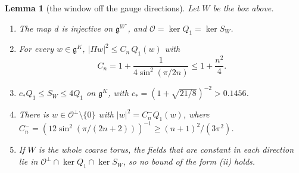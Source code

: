 \documentclass[11pt]{amsart}
\newtheorem{lemma}[theorem]{Lemma}
\theoremstyle{definition}
\theoremstyle{remark}
\numberwithin{equation}{section}
\newcommand{\g}{\mathfrak{g}}
\begin{document}
\begin{lemma}[the window off the gauge directions]\label{lem:windowgap}
Let $W$ be the box above.
\begin{enumerate}[label=\textup{(\roman*)},leftmargin=*]
\item The map $d$ is injective on $\g^{W^\circ}$, and $\mathcal O=\ker
Q_1=\ker S_W$.
\item For every $w\in\g^K$, $|\Pi w|^2\le C_n\,Q_1(w)$ with
\[
C_n=1+\frac1{4\sin^2(\pi/2n)}\le1+\frac{n^2}4 .
\]
\item $c_*Q_1\le S_W\le4Q_1$ on $\g^K$, with $c_*=(1+\sqrt{21/8})^{-2}>
0.1456$.
\item There is $w\in\mathcal O^\perp\setminus\{0\}$ with $|w|^2=C_n^-Q_1
(w)$, where $C_n^-=(12\sin^2(\pi/(2n+2)))^{-1}\ge(n+1)^2/(3\pi^2)$.
\item If $W$ is the whole coarse torus, the fields that are constant in each
direction lie in $\mathcal O^\perp\cap\ker Q_1\cap\ker S_W$, so no
bound of the form \textup{(ii)} holds.
\end{enumerate}
\end{lemma}
\end{document}
